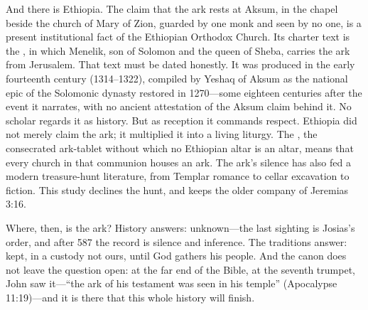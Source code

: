 And there is Ethiopia. The claim that the ark rests at Aksum, in the
chapel beside the church of Mary of Zion, guarded by one monk and seen by
no one, is a present institutional fact of the Ethiopian Orthodox Church.
Its charter text is the , in which Menelik, son of
Solomon and the queen of Sheba, carries the ark from Jerusalem. That text
must be dated honestly. It was produced in the early fourteenth century
(1314--1322), compiled by Yeshaq of Aksum as the national epic of the
Solomonic dynasty restored in 1270---some eighteen centuries after the
event it narrates, with no ancient attestation of the Aksum claim behind
it. No scholar regards it as history. But as reception it commands
respect. Ethiopia did not merely claim the ark; it multiplied it into a
living liturgy. The , the consecrated ark-tablet without
which no Ethiopian altar is an altar, means that every church in that
communion houses an ark.
The ark's silence has also fed a modern treasure-hunt literature, from
Templar romance to cellar excavation to fiction. This study declines the
hunt, and keeps the older company of Jeremias 3:16.

Where, then, is the ark? History answers: unknown---the last sighting is
Josias's order, and after 587 the record is silence and inference. The
traditions answer: kept, in a custody not ours, until God gathers his
people. And the canon does not leave the question open: at the far end of
the Bible, at the seventh trumpet, John saw it---``the ark of his testament
was seen in his temple'' (Apocalypse 11:19)---and it is there that this
whole history will finish.
